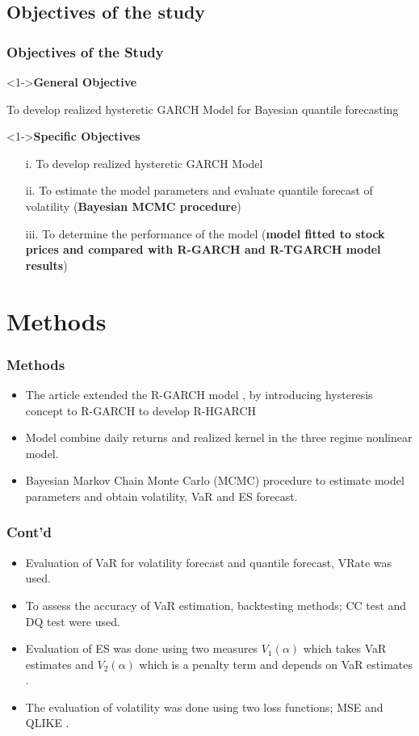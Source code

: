 \documentclass[unknownkeysallowed]{beamer}
\begin{document}
\subsection{Objectives of the study}
\begin{frame}
	\frametitle{\textbf{Objectives of the Study}}
	\begin{exampleblock}
		<1->{\textbf{General Objective}}
	\end{exampleblock}
     To develop realized hysteretic GARCH Model for Bayesian quantile forecasting
    \begin{exampleblock}
    	<1->{\textbf{Specific Objectives}}
    \end{exampleblock}
    \begin{itemize}
    	\item [i.] To develop realized hysteretic GARCH Model
    	\item [ii.] To estimate the model parameters and evaluate quantile forecast of volatility (\textbf{Bayesian MCMC procedure})
    	\item [iii.] To determine the performance of the model (\textbf{model fitted to stock prices and compared with R-GARCH and R-TGARCH model results})
    \end{itemize}
\end{frame}

\section{Methods}
\begin{frame}
	\frametitle{\textbf{Methods}}
    	\begin{itemize}
			\item The article extended the R-GARCH model \cite{chen2019bayesian}, by introducing hysteresis concept to R-GARCH to develop R-HGARCH
			\item Model combine daily returns and realized kernel in the three regime nonlinear model. \item Bayesian Markov Chain Monte Carlo (MCMC) procedure to estimate model parameters and obtain volatility, VaR and ES forecast.
			\end{itemize}
	\end{frame}
		\begin{frame}
			\frametitle{\textbf{Cont'd}}
		\begin{itemize}
			\item Evaluation of VaR for volatility forecast and quantile forecast, VRate was used.
			\item To assess the accuracy of VaR estimation, backtesting methods; CC test \cite{christoffersen1998evaluating} and DQ test \cite{engle2004caviar} were used.
			\item Evaluation of ES was done using two measures $V_{1}(\alpha)$ which takes VaR estimates and $V_{2}(\alpha)$ which is a penalty term and depends on VaR estimates \cite{embrechts2005strategic,takahashi2016volatility}.
			\item The evaluation of volatility was done using two loss functions; MSE and QLIKE \cite{patton2011volatility}.
    \end{itemize}
	   \end{frame}
\end{document}
